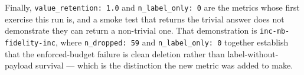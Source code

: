 \documentclass[11pt]{article}
\begin{document}
Finally, \texttt{value\_retention: 1.0} and \texttt{n\_label\_only: 0} are the metrics whose
first exercise this run is, and a smoke test that returns the trivial answer does not
demonstrate they can return a non-trivial one. That demonstration is
\texttt{inc-mb-fidelity-inc}, where \texttt{n\_dropped: 59} and \texttt{n\_label\_only: 0}
together establish that the enforced-budget failure is clean deletion rather than
label-without-payload survival --- which is the distinction the new metric was added to make.
\end{document}

